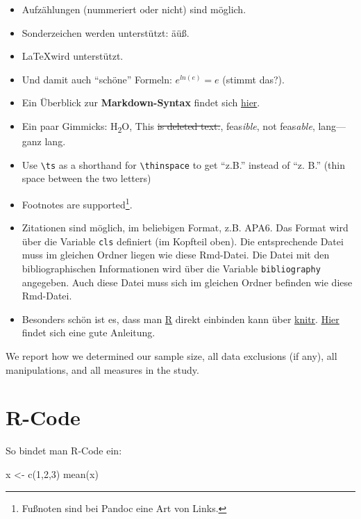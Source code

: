 \documentclass[11pt,a4paper,oneside]{article}
\newenvironment{Shaded}{\begin{snugshade}}{\end{snugshade}}
\newcommand{\DecValTok}[1]{\textcolor[rgb]{0.00,0.00,0.81}{#1}}
\newcommand{\FunctionTok}[1]{\textcolor[rgb]{0.00,0.00,0.00}{#1}}
\newcommand{\NormalTok}[1]{#1}
\newcommand{\OtherTok}[1]{\textcolor[rgb]{0.56,0.35,0.01}{#1}}
\newcommand{\ts}{\thinspace}
\begin{document}
\begin{itemize}
\item
  Aufzählungen (nummeriert oder nicht) sind möglich.
\item
  Sonderzeichen werden unterstützt: äüß.
\item
  \LaTeX wird unterstützt.
\item
  Und damit auch \enquote{schöne} Formeln: \(e^{ln(e)}=e\) (stimmt
  das?).
\item
  Ein Überblick zur \textbf{Markdown-Syntax} findet sich
  \href{http://pandoc.org/README.html\#pandocs-markdown}{hier}.
\item
  Ein paar Gimmicks: H\textsubscript{2}O, This \sout{is deleted text.},
  feas\emph{ible}, not feas\emph{able}, lang---ganz lang.
\item
  Use \texttt{\textbackslash{}ts} as a shorthand for
  \texttt{\textbackslash{}thinspace} to get \enquote{z.\ts B.} instead
  of \enquote{z. B.} (thin space between the two letters)
\item
  Footnotes are supported\footnote{Fußnoten sind bei Pandoc eine Art von
    Links.}.
\item
  Zitationen sind möglich, im beliebigen Format, z.B. APA6. Das Format
  wird über die Variable \texttt{cls} definiert (im Kopfteil oben). Die
  entsprechende Datei muss im gleichen Ordner liegen wie diese
  Rmd-Datei. Die Datei mit den bibliographischen Informationen wird über
  die Variable \texttt{bibliography} angegeben. Auch diese Datei muss
  sich im gleichen Ordner befinden wie diese Rmd-Datei.
\item
  Besonders schön ist es, dass man \href{https://cran.r-project.org}{R}
  direkt einbinden kann über \href{http://yihui.name/knitr/}{knitr}.
  \href{http://galahad.well.ox.ac.uk/repro/}{Hier} findet sich eine gute
  Anleitung.
\end{itemize}

We report how we determined our sample size, all data exclusions (if
any), all manipulations, and all measures in the study.

\hypertarget{r-code}{%
\section{R-Code}\label{r-code}}

So bindet man R-Code ein:

\begin{Shaded}
\begin{Highlighting}[]
\NormalTok{x }\OtherTok{\textless{}{-}} \FunctionTok{c}\NormalTok{(}\DecValTok{1}\NormalTok{,}\DecValTok{2}\NormalTok{,}\DecValTok{3}\NormalTok{)}
\FunctionTok{mean}\NormalTok{(x)}
\end{Highlighting}
\end{Shaded}
\end{document}
